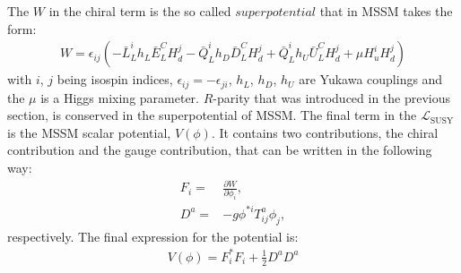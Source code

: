 The $W$ in the chiral term is the so called $superpotential$ that in MSSM takes the form:
\begin{align} 
W=\epsilon_{ij}(-\bar{L}_{L}^{i}h_{L}\bar{E}_{L}^{C}H_{d}^{j}-\bar{Q}_{L}^{i}h_{D}\bar{D}_{L}^{C}H_{d}^{j}+\bar{Q}_{L}^{i}h_{U}\bar{U}_{L}^{C}H_{d}^{j}+\mu H_{u}^{i}H_{d}^{j})
\end{align}
with $i$, $j$ being isospin indices, $\epsilon_{ij}=-\epsilon_{ji}$, $h_{L}$, $h_{D}$, $h_{U}$ are Yukawa couplings and the $\mu$ is a Higgs mixing parameter.
$R$-parity that was introduced in the previous section, is conserved in the superpotential of MSSM. 
The final term in the $\mathcal{L}_{\mathrm{SUSY}}$ is the MSSM scalar potential, $V(\phi)$. 
It contains two contributions, the chiral contribution and the gauge contribution, that can be written in the following way:
\begin{align}
F_{i}=&\frac{\partial W}{\partial \phi_{i}},\\
D^{a}=&-g\phi^{*i}T_{ij}^{a}\phi_{j},
\end{align}
respectively. The final expression for the potential is:
\begin{align}
V(\phi)=F_{i}^{*}F_{i}+\frac{1}{2}D^{a}D^{a}
\end{align}
